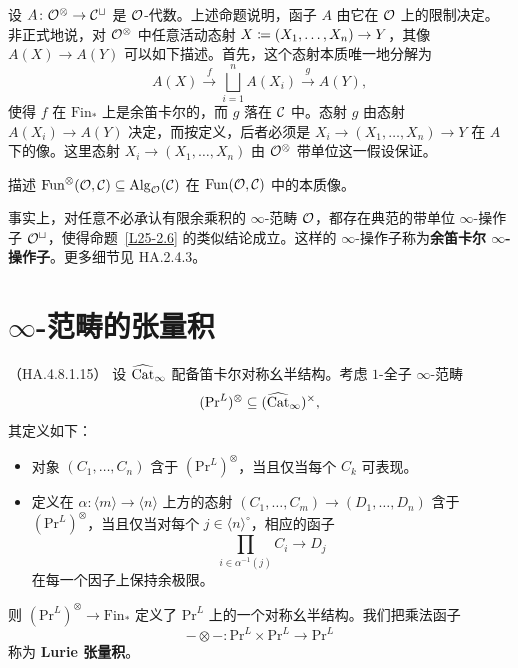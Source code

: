 \begin{remark}\label{L25-2.7}
设 $A\colon\mathcal{O}^{\otimes}\to\mathcal{C}^{\sqcup}$ 是 $\mathcal{O}$-代数。上述命题说明，函子 $A$ 由它在 $\mathcal{O}$ 上的限制决定。非正式地说，对 $\mathcal{O}^{\otimes}$ 中任意活动态射 $X\coloneqq(X_{1},\dots,X_{n})\to Y$，其像 $A(X)\to A(Y)$ 可以如下描述。首先，这个态射本质唯一地分解为
\[
A(X)\xrightarrow{\ f\ }\bigsqcup_{i=1}^{n}A(X_{i})\xrightarrow{\ g\ }A(Y),
\]
使得 $f$ 在 $\mathrm{Fin}_{*}$ 上是余笛卡尔的，而 $g$ 落在 $\mathcal{C}$ 中。态射 $g$ 由态射 $A(X_{i})\to A(Y)$ 决定，而按定义，后者必须是 $X_{i}\to(X_{1},\dots,X_{n})\to Y$ 在 $A$ 下的像。这里态射 $X_{i}\to(X_{1},\dots,X_{n})$ 由 $\mathcal{O}^{\otimes}$ 带单位这一假设保证。
\end{remark}

\begin{exercise}\label{L25-2.8}
描述 $\operatorname{Fun}^{\otimes}(\mathcal{O},\mathcal{C})\subseteq\operatorname{Alg}_{\mathcal{O}}(\mathcal{C})$ 在 $\operatorname{Fun}(\mathcal{O},\mathcal{C})$ 中的本质像。
\end{exercise}

\begin{remark}\label{L25-2.9}
事实上，对任意不必承认有限余乘积的 $\infty$-范畴 $\mathcal{O}$，都存在典范的带单位 $\infty$-操作子 $\mathcal{O}^{\sqcup}$，使得命题~\ref{L25-2.6} 的类似结论成立。这样的 $\infty$-操作子称为\textbf{余笛卡尔 $\infty$-操作子}。更多细节见 HA.2.4.3。
\end{remark}

\section{$\infty$-范畴的张量积}

\begin{theoremdef}\label{L25-3.1}（HA.4.8.1.15）
设 $\widehat{\operatorname{Cat}}_{\infty}$ 配备笛卡尔对称幺半结构。考虑 $1$-全子 $\infty$-范畴
\[
(\mathrm{Pr}^{L})^{\otimes}\subseteq(\widehat{\operatorname{Cat}}_{\infty})^{\times},
\]
其定义如下：
\begin{itemize}[leftmargin=2.2em,itemsep=0.1em]
\item 对象 $(C_{1},\dots,C_{n})$ 含于 $(\mathrm{Pr}^{L})^{\otimes}$，当且仅当每个 $C_{k}$ 可表现。
\item 定义在 $\alpha\colon\langle m\rangle\to\langle n\rangle$ 上方的态射 $(C_{1},\dots,C_{m})\to(D_{1},\dots,D_{n})$ 含于 $(\mathrm{Pr}^{L})^{\otimes}$，当且仅当对每个 $j\in\langle n\rangle^{\circ}$，相应的函子
\[
\prod_{i\in\alpha^{-1}(j)}C_{i}\to D_{j}
\]
在每一个因子上保持余极限。
\end{itemize}
则 $(\mathrm{Pr}^{L})^{\otimes}\to\mathrm{Fin}_{*}$ 定义了 $\mathrm{Pr}^{L}$ 上的一个对称幺半结构。我们把乘法函子
\[
-\otimes-\colon\mathrm{Pr}^{L}\times\mathrm{Pr}^{L}\to\mathrm{Pr}^{L}
\]
称为 \textbf{Lurie 张量积}。
\end{theoremdef}

